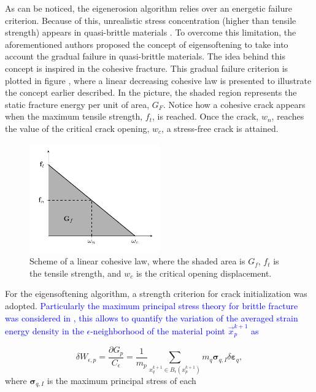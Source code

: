 \documentclass[preprint,12pt,a4paper]{elsarticle}
\newcommand{\tens}[1]{
  \ensuremath{\mathbf{{#1}}}
}
\newcommand{\MMP}[1]{
  \textcolor{blue}{{#1}}
}
\begin{document}
As can be noticed, the eigenerosion algorithm relies over an energetic
failure criterion. Because of this, unrealistic stress
concentration (higher than tensile strength) appears in quasi-brittle
materials \cite{Navas_2017_ES}. To overcome this limitation, the
aforementioned authors proposed the concept of eigensoftening to take
into account the gradual failure in quasi-brittle materials. The idea
behind this concept is inspired in the cohesive fracture. This gradual
failure criterion is plotted in figure \label{fig:Damage-ft-wc}, where
a linear decreasing cohesive law is presented to illustrate the
concept earlier described. In the picture, the shaded region represents
the static fracture energy per unit of area, $G_F$. Notice how a
cohesive crack appears when the maximum tensile strength, $f_t$, is
reached. Once the crack, $w_n$, reaches the value of the critical
crack opening, $w_c$, a stress-free crack is attained.
\begin{figure}
  \centering
  \includegraphics[width=0.5\textwidth]{Figure-Damage}
  \caption{Scheme of a linear cohesive law, where the shaded area is
    $G_f$, $f_t$ is the tensile strength, and $w_c$ is the critical
    opening displacement.}
  \label{fig:Damage-ft-wc}
\end{figure}
For the eigensoftening algorithm, a strength criterion for crack
initialization was adopted. \MMP{Particularly the maximum principal stress
theory for brittle fracture was considered in \cite{Navas_2017_ES},
this allows to quantify the variation of the averaged strain energy density in the
$\epsilon$-neighborhood of the material point $\vec{x}_p^{k+1}$ as}
\begin{equation}
  \label{eq:variation-averaged-strain-energy-density}
  \delta W_{\epsilon,p} = \frac{\partial G_p}{C_{\epsilon}} =
  \frac{1}{m_p} \sum_{x_q^{k+1} \in
  B_{\epsilon}(x_p^{k+1})} m_q \tens{\sigma}_{q,I} \delta \tens{\varepsilon}_q,
\end{equation}
where $\tens{\sigma}_{q,I}$ is the maximum principal stress of each
\end{document}
